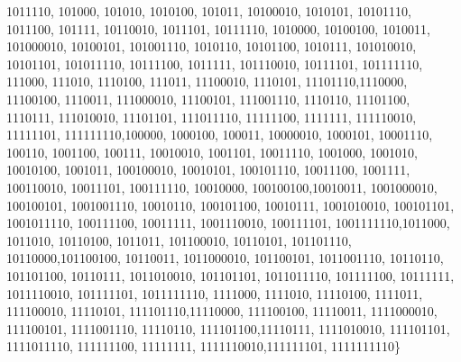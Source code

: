 \documentclass{article}
\begin{document}
\begin{enumerate}
{\begin{enumerate}
{                    1011110, 101000, 101010, 1010100, 101011, 10100010, 1010101, 
                    10101110, 1011100, 101111, 10110010, 1011101, 10111110, 1010000,
                    10100100, 1010011, 101000010, 10100101, 101001110, 1010110, 
                    10101100, 1010111, 101010010, 10101101, 101011110, 10111100, 
                    1011111, 101110010, 10111101, 101111110, 111000, 111010, 
                    1110100, 111011, 11100010, 1110101, 11101110,1110000, 11100100,
                    1110011, 111000010, 11100101, 111001110, 1110110, 11101100, 
                    1110111, 111010010, 11101101, 111011110, 11111100, 1111111, 
                    111110010, 11111101, 111111110,100000, 1000100, 100011, 10000010, 
                    1000101, 10001110, 100110, 1001100, 100111, 10010010, 1001101, 
                    10011110, 1001000, 1001010, 10010100, 1001011, 100100010, 
                    10010101, 100101110, 10011100, 1001111, 100110010, 10011101, 
                    100111110, 10010000, 100100100,10010011, 1001000010, 100100101, 
                    1001001110, 10010110, 100101100, 10010111, 1001010010, 100101101, 
                    1001011110, 100111100, 10011111, 1001110010, 100111101, 
                    1001111110,1011000, 1011010, 10110100, 1011011, 101100010, 
                    10110101, 101101110, 10110000,101100100, 10110011, 1011000010, 
                    101100101, 1011001110, 10110110, 101101100, 10110111, 1011010010, 
                    101101101, 1011011110, 101111100, 10111111, 1011110010, 101111101,
                    1011111110, 1111000, 1111010, 11110100, 1111011, 111100010, 
                    11110101, 111101110,11110000, 111100100, 11110011, 1111000010,
                    111100101, 1111001110, 11110110, 111101100,11110111, 1111010010, 
                    111101101, 1111011110, 111111100, 11111111, 1111110010,111111101, 
                    1111111110\}
                }
            \end{enumerate}
        }
    \end{enumerate}
\end{document}
